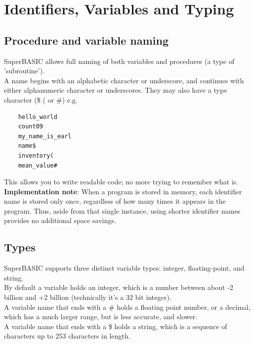 \chapter{Identifiers, Variables and Typing}
\label{chap:variables}

\section{Procedure and variable naming}

SuperBASIC allows full naming of both variables and procedures (a type of 'subroutine').\\

A name begins with an alphabetic character or underscore, and continues with either alphanumeric character or underscores. They may also have a type character (\$ ( or \#) e.g.

\begin{verbatim}
	hello_world
	count09
	my_name_is_earl
	name$
	inventory(
	mean_value#
\end{verbatim}

This allows you to write readable code; no more trying to remember what  is.\\

\textbf{Implementation note}: When a program is stored in memory, each identifier name is stored only once, regardless of how many times it appears in the program. Thus, aside from that single instance, using shorter identifier names provides no additional space savings.

\section{Types}

SuperBASIC supports three distinct variable types: integer, floating-point, and string.\\

By default a variable holds an integer, which is a number between about -2 billion and +2 billion (technically it's a 32 bit integer).\\

A variable name that ends with a \# holds a floating point number, or a decimal, which has a much larger range, but is less accurate, and slower.\\

A variable name that ends with a \$ holds a string, which is a sequence of characters up to 253 characters in length.\\

